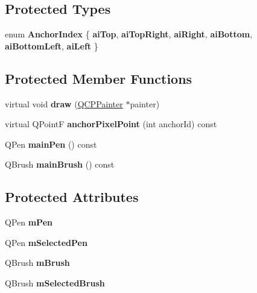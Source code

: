 \subsection*{\-Protected \-Types}
\begin{DoxyCompactItemize}
\item 
enum {\bfseries \-Anchor\-Index} \{ \*
{\bfseries ai\-Top}, 
{\bfseries ai\-Top\-Right}, 
{\bfseries ai\-Right}, 
{\bfseries ai\-Bottom}, 
\*
{\bfseries ai\-Bottom\-Left}, 
{\bfseries ai\-Left}
 \}
\end{DoxyCompactItemize}
\subsection*{\-Protected \-Member \-Functions}
\begin{DoxyCompactItemize}
\item 
\hypertarget{classQCPItemRect_a18cd583638b876cdd50f1a155ec182aa}{virtual void {\bfseries draw} (\hyperlink{classQCPPainter}{\-Q\-C\-P\-Painter} $\ast$painter)}\label{classQCPItemRect_a18cd583638b876cdd50f1a155ec182aa}

\item 
\hypertarget{classQCPItemRect_ae0973f8281fb52361b0c99ee899be07e}{virtual \-Q\-Point\-F {\bfseries anchor\-Pixel\-Point} (int anchor\-Id) const }\label{classQCPItemRect_ae0973f8281fb52361b0c99ee899be07e}

\item 
\hypertarget{classQCPItemRect_afa0fb7c6328a1e197ecd537de36daf8f}{\-Q\-Pen {\bfseries main\-Pen} () const }\label{classQCPItemRect_afa0fb7c6328a1e197ecd537de36daf8f}

\item 
\hypertarget{classQCPItemRect_ab0bd8e272e822ec851ba5b0c20e9200e}{\-Q\-Brush {\bfseries main\-Brush} () const }\label{classQCPItemRect_ab0bd8e272e822ec851ba5b0c20e9200e}

\end{DoxyCompactItemize}
\subsection*{\-Protected \-Attributes}
\begin{DoxyCompactItemize}
\item 
\hypertarget{classQCPItemRect_aa0d49323628d6752026056bfb52afd86}{\-Q\-Pen {\bfseries m\-Pen}}\label{classQCPItemRect_aa0d49323628d6752026056bfb52afd86}

\item 
\hypertarget{classQCPItemRect_a73cc0bee61de3c67221ec8c7a76a29ed}{\-Q\-Pen {\bfseries m\-Selected\-Pen}}\label{classQCPItemRect_a73cc0bee61de3c67221ec8c7a76a29ed}

\item 
\hypertarget{classQCPItemRect_a2d7f207fada27588b3a52b19234d3c2e}{\-Q\-Brush {\bfseries m\-Brush}}\label{classQCPItemRect_a2d7f207fada27588b3a52b19234d3c2e}

\item 
\hypertarget{classQCPItemRect_a21b70eee59b6e19ae0bbdf037b13508f}{\-Q\-Brush {\bfseries m\-Selected\-Brush}}\label{classQCPItemRect_a21b70eee59b6e19ae0bbdf037b13508f}

\end{DoxyCompactItemize}


